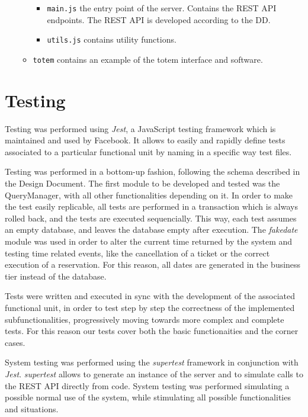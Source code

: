 \documentclass[
]{article}
\begin{document}
\begin{itemize}
\begin{itemize}
\begin{itemize}
      \item \texttt{main.js} the entry point of the server. Contains the REST API endpoints. The REST API is developed according to the DD.
      \item \texttt{utils.js} contains utility functions.
    \end{itemize}
    \item \texttt{totem} contains an example of the totem interface and software.
  \end{itemize}
\end{itemize}

\hypertarget{testing}{%
\section{Testing}\label{testing}}

Testing was performed using \emph{Jest}, a JavaScript testing framework which is maintained and used by Facebook. It allows to easily and rapidly define tests associated to a particular functional unit by naming in a specific way test files.

Testing was performed in a bottom-up fashion, following the schema described in the Design Document. The first module to be developed and tested was the QueryManager, with all other functionalities depending on it. In order to make the test easily replicable, all tests are performed in a transaction which is always rolled back, and the tests are executed sequencially. This way, each test assumes an empty database, and leaves the database empty after execution. The \emph{fakedate} module was used in order to alter the current time returned by the system and testing time related events, like the cancellation of a ticket or the correct execution of a reservation. For this reason, all dates are generated in the business tier instead of the database.

Tests were written and executed in sync with the development of the associated functional unit, in order to test step by step the correctness of the implemented subfunctionalities, progressively moving towards more complex and complete tests. For this reason our tests cover both the basic functionaities and the corner cases.

System testing was performed using the \emph{supertest} framework in conjunction with \emph{Jest}. \emph{supertest} allows to generate an instance of the server and to simulate calls to the REST API directly from code. System testing was performed simulating a possible normal use of the system, while stimulating all possible functionalities and situations.
\end{document}
